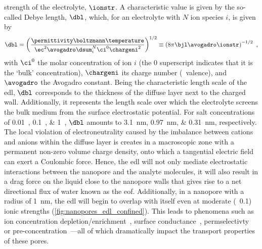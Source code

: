 strength of the electrolyte, $\ionstr$. A characteristic value is given by the so-called Debye length, $\dbl$,
which, for an electrolyte with $N$ ion species $i$, is given by~\cite{Bocquet-2010}
%
\begin{equation}\label{eq:nanopores_debye_length}
  \dbl = \left(
          \dfrac{ \permittivity \boltzmann \temperature }%
                { \ec^2 \avogadro \dsum_i^N \ci^0 \chargeni^2 } \right)^{1/2}
       \equiv \left( 8 \pi \bjl \avogadro \ionstr \right)^{-1/2}
  \text{ ,}
\end{equation}
%
with $\ci^0$ the molar concentration of ion $i$ (the $0$ superscript indicates that it is the `bulk'
concentration), $\chargeni$ its charge number (\ie~valence), and $\avogadro$ the Avogadro constant. Being the
characteristic length scale of the \gls{edl}, $\dbl$ corresponds to the thickness of the diffuse layer next to
the charged wall. Additionally, it represents the length scale over which the electrolyte screens the bulk
medium from the surface electrostatic potential. For salt concentrations of \SIlist{0.01;0.1;1}{\Molar},
$\dbl$ amounts to \SIlist{3.1;0.97;0.31}{\nm}, respectively. The local violation of electroneutrality caused
by the imbalance between cations and anions within the diffuse layer is creates in a macroscopic zone with a
permanent non-zero volume charge density, onto which a tangential electric field can exert a Coulombic force.
Hence, the \gls{edl} will not only mediate electrostatic interactions between the nanopore and the analyte
molecules, it will also result in a drag force on the liquid close to the nanopore walls that gives rise to a
net directional flux of water known as the \gls{eof}. Additionally, in a nanopore with a radius of
\SI{1}{\nm}, the \gls{edl} will begin to overlap with itself even at moderate (\eg~\SI{0.1}{\Molar}) ionic
strengths (\cref{fig:nanopores_edl_confined}). This leads to phenomena such as ion concentration
depletion/enrichment~\cite{Plecis-2005}, surface conductance~\cite{Stein-2004},
permselectivty~\cite{Plecis-2005} or pre-concentration~\cite{Pu-2004}---all of which dramatically impact the
transport properties of these pores.

